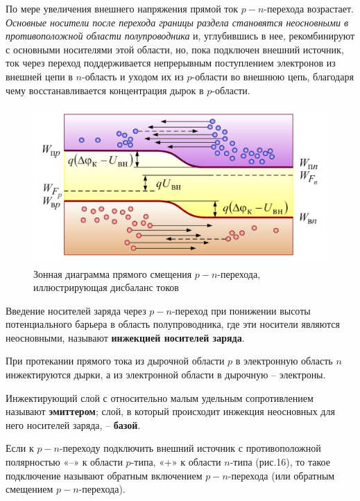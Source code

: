     \par По мере увеличения внешнего напряжения прямой ток \(p-n\)-перехода возрастает. \textit{Основные носители после перехода границы раздела становятся неосновными в противоположной области полупроводника} и, углубившись в нее, рекомбинируют с основными носителями этой области, но, пока подключен внешний источник, ток через переход поддерживается непрерывным поступлением электронов из внешней цепи в \(n\)-область и уходом их из \(p\)-области во внешнюю цепь, благодаря чему восстанавливается концентрация дырок в \(p\)-области.
    
    \begin{figure}[h]
    	\centering
    	\includegraphics[height=6cm]{img/16} 
    	\captionsetup{font=footnotesize}
    	\caption{Зонная диаграмма прямого смещения \(p-n\)-перехода, иллюстрирующая дисбаланс токов} 
    \end{figure}
    
    \par Введение носителей заряда через \(p-n\)-переход при понижении высоты потенциального барьера в область полупроводника, где эти носители являются неосновными, называют \textbf{инжекцией носителей заряда}. 
    \par При протекании прямого тока из дырочной области \(p\) в электронную область \(n\) инжектируются дырки, а из электронной области в дырочную – электроны.
    
    \par Инжектирующий слой с относительно малым удельным сопротивлением называют \textbf{эмиттером}; слой, в который происходит инжекция неосновных для него носителей заряда, – \textbf{базой}.
    \\
    
    \par Если к \(p-n\)-переходу подключить внешний источник с противоположной полярностью «–» к области \(p\)-типа, «+» к области \(n\)-типа (рис.16), то такое подключение называют обратным включением \(p-n\)-перехода (или обратным смещением \(p-n\)-перехода).
    
